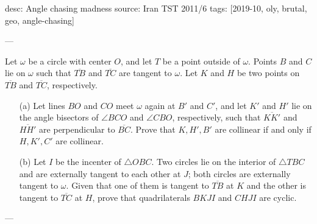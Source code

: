 desc: Angle chasing madness
source: Iran TST 2011/6
tags: [2019-10, oly, brutal, geo, angle-chasing]

---

Let $\omega$ be a circle with center $O$, and let $T$ be a point outside of $\omega$. Points $B$ and $C$ lie on $\omega$ such that $\overline{TB}$ and $\overline{TC}$ are tangent to $\omega$. Let $K$ and $H$ be two points on $\overline{TB}$ and $\overline{TC}$, respectively.
\begin{itemize}
    \item[(a)] Let lines $BO$ and $CO$ meet $\omega$ again at $B'$ and $C'$, and let $K'$ and $H'$ lie on the angle bisectors of $\angle BCO$ and $\angle CBO$, respectively, such that $\overline{KK'}$ and $\overline{HH'}$ are perpendicular to $\overline{BC}$. Prove that $K,H',B'$ are collinear if and only if $H,K',C'$ are collinear.
        \vspace{-0.5em}
    \item[(b)] Let $I$ be the incenter of $\triangle OBC$. Two circles lie on the interior of $\triangle TBC$ and are externally tangent to each other at $J$; both circles are externally tangent to $\omega$. Given that one of them is tangent to $\overline{TB}$ at $K$ and the other is tangent to $\overline{TC}$ at $H$, prove that quadrilaterals $BKJI$ and $CHJI$ are cyclic.
\end{itemize}

---

